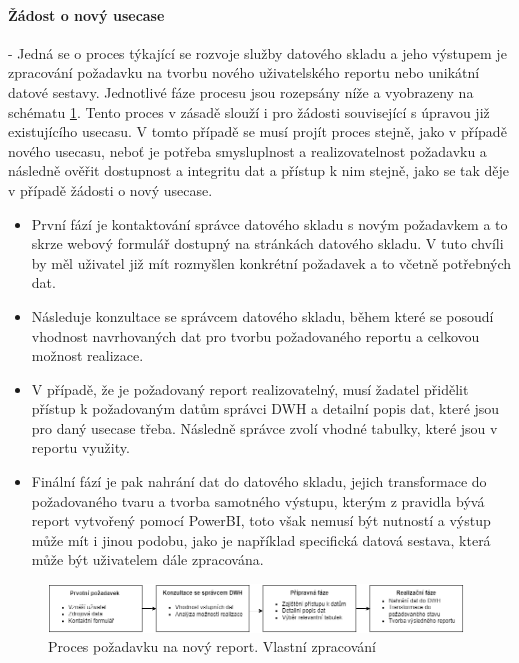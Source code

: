\documentclass[
  digital,     %
  twoside,     %
  lof,         %
  lot,         %
]{fithesis4}
\begin{document}
\paragraph{Žádost o nový usecase} - Jedná se o proces týkající se rozvoje služby datového skladu a jeho výstupem je zpracování požadavku na tvorbu nového uživatelského reportu nebo unikátní datové sestavy. Jednotlivé fáze procesu jsou rozepsány níže a vyobrazeny na schématu \ref{fig:new_report}. Tento proces v zásadě slouží i pro žádosti související s úpravou již existujícího usecasu. V tomto případě se musí projít proces stejně, jako v případě nového usecasu, neboť je potřeba smysluplnost a realizovatelnost požadavku a následně ověřit dostupnost a integritu dat a přístup k nim stejně, jako se tak děje v případě žádosti o nový usecase.
\begin{itemize}
    \item První fází je kontaktování správce datového skladu s novým požadavkem a to skrze webový formulář dostupný na stránkách datového skladu. V tuto chvíli by měl uživatel již mít rozmyšlen konkrétní požadavek a to včetně potřebných dat. 
    \item Následuje konzultace se správcem datového skladu, během které se posoudí vhodnost navrhovaných dat pro tvorbu požadovaného reportu a celkovou možnost realizace.
    \item V případě, že je požadovaný report realizovatelný, musí žadatel přidělit přístup k požadovaným datům správci DWH a detailní popis dat, které jsou pro daný usecase třeba. Následně správce zvolí vhodné tabulky, které jsou v reportu využity.
    \item Finální fází je pak nahrání dat do datového skladu, jejich transformace do požadovaného tvaru a tvorba samotného výstupu, kterým z pravidla bývá report vytvořený pomocí PowerBI, toto však nemusí být nutností a výstup může mít i jinou podobu, jako je například specifická datová sestava, která může být uživatelem dále zpracována. 
\end{itemize}
    \begin{figure}[t]
        \begin{center}
            \includegraphics[width=11cm]{img/new_usecase.png}
        \end{center}
        \caption{Proces požadavku na nový report. Vlastní zpracování}
        \label{fig:new_report}
    \end{figure} 
\end{document}
